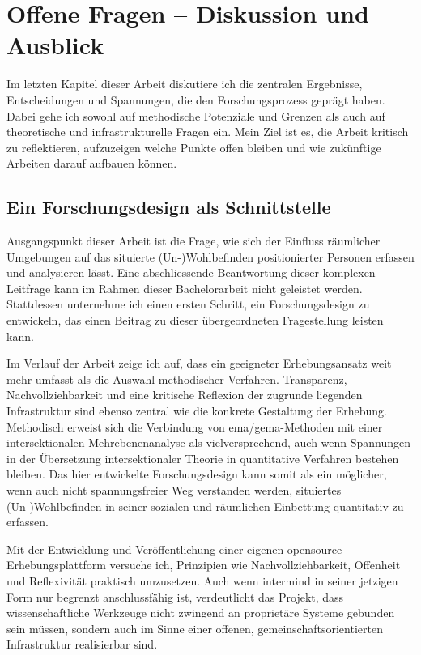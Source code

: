 \chapter{Offene Fragen -- Diskussion und Ausblick} \label{sec:diskussion}

Im letzten Kapitel dieser Arbeit diskutiere ich die zentralen Ergebnisse, Entscheidungen und Spannungen, die den Forschungsprozess geprägt haben. Dabei gehe ich sowohl auf methodische Potenziale und Grenzen als auch auf theoretische und infrastrukturelle Fragen ein. Mein Ziel ist es, die Arbeit kritisch zu reflektieren, aufzuzeigen welche Punkte offen bleiben und wie zukünftige Arbeiten darauf aufbauen können.

\section{Ein Forschungsdesign als Schnittstelle}

Ausgangspunkt dieser Arbeit ist die Frage, wie sich der Einfluss räumlicher Umgebungen auf das situierte (Un\nobreakdash-)Wohl\-be\-find\-en  positionierter Personen erfassen und analysieren lässt. Eine abschliessende Beantwortung dieser komplexen Leitfrage kann im Rahmen dieser Bachelorarbeit nicht geleistet werden. Stattdessen unternehme ich einen ersten Schritt, ein Forschungsdesign zu entwickeln, das einen Beitrag zu dieser übergeordneten Fragestellung leisten kann.

Im Verlauf der Arbeit zeige ich auf, dass ein geeigneter Erhebungsansatz weit mehr umfasst als die Auswahl methodischer Verfahren. Transparenz, Nachvollziehbarkeit und eine kritische Reflexion der zugrunde liegenden Infrastruktur sind ebenso zentral wie die konkrete Gestaltung der Erhebung. Methodisch erweist sich die Verbindung von \gls{ema}/\gls{gema}-Methoden mit einer intersektionalen Mehrebenenanalyse als vielversprechend, auch wenn Spannungen in der Übersetzung intersektionaler Theorie in quantitative Verfahren bestehen bleiben. Das hier entwickelte Forschungsdesign kann somit als ein möglicher, wenn auch nicht spannungsfreier Weg verstanden werden, situiertes (Un\nobreakdash-)Wohl\-be\-find\-en in seiner sozialen und räumlichen Einbettung quantitativ zu erfassen.

Mit der Entwicklung und Veröffentlichung einer eigenen \gls{opensource}-Erhebungsplattform versuche ich, Prinzipien wie Nachvollziehbarkeit, Offenheit und Reflexivität praktisch umzusetzen. Auch wenn \gls{intermind} in seiner jetzigen Form nur begrenzt anschlussfähig ist, verdeutlicht das Projekt, dass wissenschaftliche Werkzeuge nicht zwingend an proprietäre Systeme gebunden sein müssen, sondern auch im Sinne einer offenen, gemeinschaftsorientierten Infrastruktur realisierbar sind.

